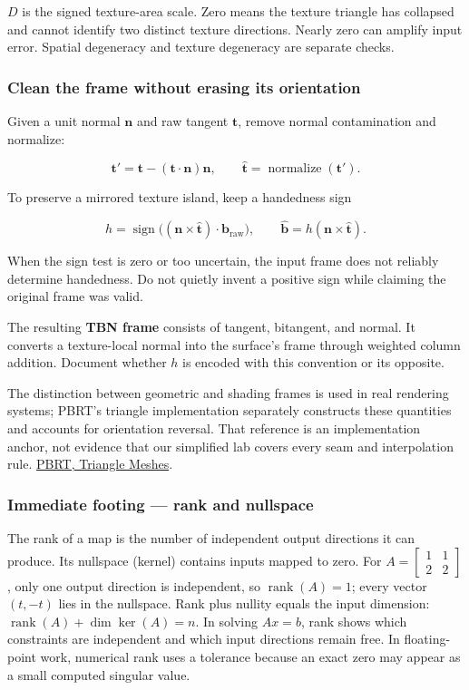 \(D\) is the signed texture-area scale. Zero means the texture triangle has collapsed and cannot identify two distinct texture directions. Nearly zero can amplify input error. Spatial degeneracy and texture degeneracy are separate checks.

\subsubsection{Clean the frame without erasing its orientation}\label{clean-the-frame-without-erasing-its-orientation}

Given a unit normal \(\mathbf n\) and raw tangent \(\mathbf t\), remove normal contamination and normalize:

\[
\mathbf t'=\mathbf t-(\mathbf t\cdot\mathbf n)\mathbf n,
\qquad \widehat{\mathbf t}=\operatorname{normalize}(\mathbf t').
\]

To preserve a mirrored texture island, keep a handedness sign

\[
h=\operatorname{sign}\big((\mathbf n\times\widehat{\mathbf t})\cdot\mathbf b_{\mathrm{raw}}\big),
\qquad
\widehat{\mathbf b}=h(\mathbf n\times\widehat{\mathbf t}).
\]

When the sign test is zero or too uncertain, the input frame does not reliably determine handedness. Do not quietly invent a positive sign while claiming the original frame was valid.

The resulting \textbf{TBN frame} consists of tangent, bitangent, and normal. It converts a texture-local normal into the surface's frame through weighted column addition. Document whether \(h\) is encoded with this convention or its opposite.

The distinction between geometric and shading frames is used in real rendering systems; PBRT's triangle implementation separately constructs these quantities and accounts for orientation reversal. That reference is an implementation anchor, not evidence that our simplified lab covers every seam and interpolation rule. \href{https://www.pbr-book.org/4ed/Shapes/Triangle_Meshes}{PBRT, Triangle Meshes}.

\subsubsection{Immediate footing --- rank and nullspace}\label{immediate-footing-rank-and-nullspace}

The rank of a map is the number of independent output directions it can produce. Its nullspace (kernel) contains inputs mapped to zero. For \(A=\begin{bmatrix}1&1\\2&2\end{bmatrix}\), only one output direction is independent, so \(\operatorname{rank}(A)=1\); every vector \((t,-t)\) lies in the nullspace. Rank plus nullity equals the input dimension: \(\operatorname{rank}(A)+\dim\ker(A)=n\). In solving \(Ax=b\), rank shows which constraints are independent and which input directions remain free. In floating-point work, numerical rank uses a tolerance because an exact zero may appear as a small computed singular value.

